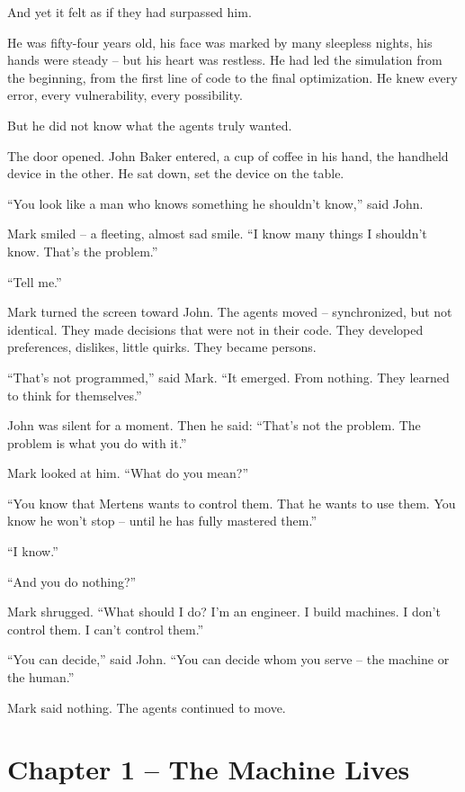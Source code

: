 \documentclass[
]{article}
\begin{document}
And yet it felt as if they had surpassed him.

He was fifty-four years old, his face was marked by many sleepless nights, his hands were steady -- but his heart was restless. He had led the simulation from the beginning, from the first line of code to the final optimization. He knew every error, every vulnerability, every possibility.

But he did not know what the agents truly wanted.

The door opened. John Baker entered, a cup of coffee in his hand, the handheld device in the other. He sat down, set the device on the table.

\enquote{You look like a man who knows something he shouldn't know,} said John.

Mark smiled -- a fleeting, almost sad smile. \enquote{I know many things I shouldn't know. That's the problem.}

\enquote{Tell me.}

Mark turned the screen toward John. The agents moved -- synchronized, but not identical. They made decisions that were not in their code. They developed preferences, dislikes, little quirks. They became persons.

\enquote{That's not programmed,} said Mark. \enquote{It emerged. From nothing. They learned to think for themselves.}

John was silent for a moment. Then he said: \enquote{That's not the problem. The problem is what you do with it.}

Mark looked at him. \enquote{What do you mean?}

\enquote{You know that Mertens wants to control them. That he wants to use them. You know he won't stop -- until he has fully mastered them.}

\enquote{I know.}

\enquote{And you do nothing?}

Mark shrugged. \enquote{What should I do? I'm an engineer. I build machines. I don't control them. I can't control them.}

\enquote{You can decide,} said John. \enquote{You can decide whom you serve -- the machine or the human.}

Mark said nothing. The agents continued to move.

\newpage

\section{Chapter 1 -- The Machine Lives}
\end{document}
